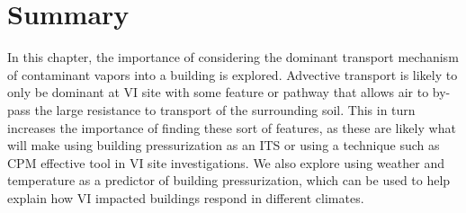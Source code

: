 \section{Summary}

In this chapter, the importance of considering the dominant transport mechanism of contaminant vapors into a building is explored.
Advective transport is likely to only be dominant at VI site with some feature or pathway that allows air to by-pass the large resistance to transport of the surrounding soil.
This in turn increases the importance of finding these sort of features, as these are likely what will make using building pressurization as an ITS or using a technique such as CPM effective tool in VI site investigations.
We also explore using weather and temperature as a predictor of building pressurization, which can be used to help explain how VI impacted buildings respond in different climates. 
